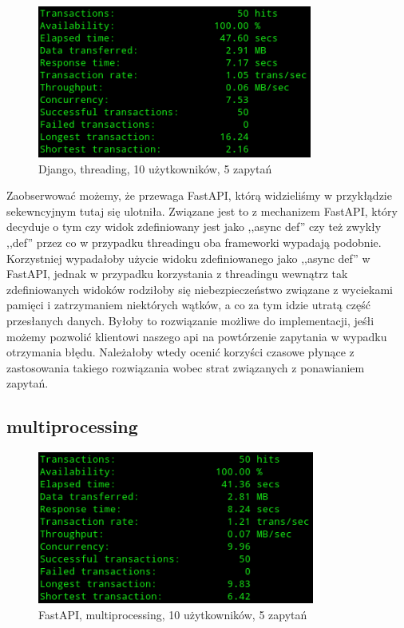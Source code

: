 \begin{figure}[H]
    \includegraphics[height=50mm]{zdjecia/10_req_thread_django}
    \centering
    \caption{Django, threading, 10 użytkowników, 5 zapytań}
\end{figure}
Zaobserwować możemy, że przewaga FastAPI, którą widzieliśmy w przykłądzie sekewncyjnym tutaj się ulotniła. Związane jest to z mechanizem FastAPI, który decyduje o tym czy widok zdefiniowany jest jako ,,async def'' czy też zwykły ,,def'' przez co w przypadku threadingu oba frameworki wypadają podobnie. Korzystniej wypadałoby użycie widoku zdefiniowanego jako ,,async def'' w FastAPI, jednak w przypadku korzystania z threadingu wewnątrz tak zdefiniowanych widoków rodziłoby się niebezpieczeństwo związane z wyciekami pamięci i zatrzymaniem niektórych wątków, a co za tym idzie utratą część przesłanych danych. Byłoby to rozwiązanie możliwe do implementacji, jeśłi możemy pozwolić klientowi naszego api na powtórzenie zapytania w wypadku otrzymania błędu. Należałoby wtedy ocenić korzyści czasowe płynące z zastosowania takiego rozwiązania wobec strat związanych z ponawianiem zapytań.

\subsection{multiprocessing}
\begin{figure}[H]
    \includegraphics[height=50mm]{zdjecia/10_req_process_fast}
    \centering
    \caption{FastAPI, multiprocessing, 10 użytkowników, 5 zapytań}
\end{figure}

